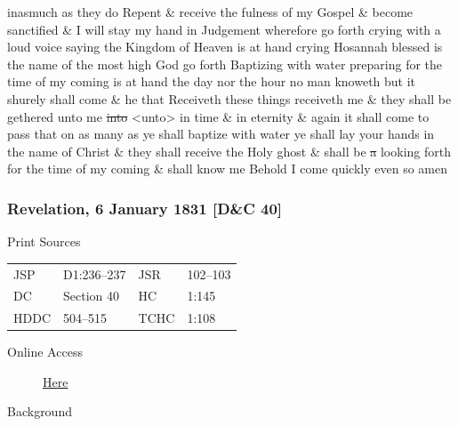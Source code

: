 inasmuch as they do Repent \& receive the fulness of my Gospel \& become sanctified \& I will stay my hand in Judgement wherefore go forth crying with a loud voice saying the Kingdom of Heaven is at hand crying Hosannah blessed is the name of the most high God go forth Baptizing with water preparing for the time of my coming is at hand the day nor the hour no man knoweth but it shurely shall come \& he that Receiveth these things receiveth me \& they shall be gethered unto me \sout{into} <unto> in time \& in eternity \& again it shall come to pass that on as many as ye shall baptize with water ye shall lay your hands in the name of Christ \& they shall receive the Holy ghost \& shall be \sout{a} looking forth for the time of my coming \& shall know me Behold I come quickly even so amen
				
		\subsubsection{Revelation, 6 January 1831 [D\&C 40]}
			\label{EMS-1831-JS-6-JAN-1831}
		
			\begin{description}
				\item[Print Sources]
			\end{description}

				\begin{tabular}{p{0.5in}p{1in}p{0.5in}p{1in}}
				JSP	 	& D1:236--237	& JSR 		& 102--103 \\
				DC	 	& Section 40 	& HC 		& 1:145 \\
				HDDC 	& 504--515		& TCHC 		& 1:108 \\
				\end{tabular}
			
			\begin{description}
				\item[Online Access] \href{https://www.josephsmithpapers.org/paper-summary/revelation-6-january-1831-dc-40/1}{Here}
			\end{description}
			
			\begin{description}
				\item[Background]
			\end{description}
			
			
